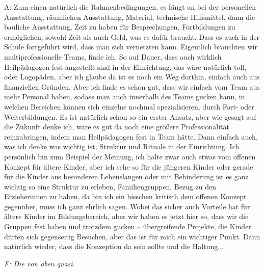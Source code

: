 A: Zum einen natürlich die Rahmenbedingungen, es fängt an bei der personellen Ausstattung, räumlichen Ausstattung, Material, technische Hilfsmittel, dann die bauliche Ausstattung, Zeit zu haben für Besprechungen, Fortbildungen zu ermöglichen, sowohl Zeit als auch Geld, was es dafür braucht. Dass es auch in der Schule fortgeführt wird, dass man sich vernetzten kann. Eigentlich bräuchten wir multiprofessionelle Teams, finde ich. So auf Dauer, dass auch wirklich Heilpädagogen fest angestellt sind in der Einrichtung, das wäre natürlich toll, oder Logopäden, aber ich glaube da ist es noch ein Weg dorthin, einfach auch aus finanziellen Gründen. Aber ich finde es schon gut, dass wir einfach vom Team aus mehr Personal haben, sodass man auch innerhalb des Teams gucken kann, in welchen Bereichen können sich einzelne nochmal spezialisieren, durch Fort- oder Weiterbildungen. Es ist natürlich schon so ein erster Ansatz, aber wie gesagt auf die Zukunft denke ich, wäre es gut da noch eine größere Professionalität reinzubringen, indem man Heilpädagogen fest in Team hätte. Dann einfach auch, was ich denke was wichtig ist, Struktur und Rituale in der Einrichtung. Ich persönlich bin zum Beispiel der Meinung, ich halte zwar auch etwas vom offenen Konzept für ältere Kinder, aber ich sehe so für die jüngeren Kinder oder gerade für die  Kinder aus besonderen Lebenslangen oder mit Behinderung ist es ganz wichtig so eine Struktur zu erleben, Familiengruppen, Bezug zu den Erzieherinnen zu haben, da bin ich ein bisschen kritisch dem offenen Konzept gegenüber, muss ich ganz ehrlich sagen. Wobei das sicher auch Vorteile hat für ältere Kinder im Bildungsbereich, aber wir haben es jetzt hier so, dass wir die Gruppen fest haben und trotzdem gucken – übergreifende Projekte, die Kinder dürfen sich gegenseitig Besuchen, aber das ist für mich ein wichtiger Punkt. Dann natürlich wieder, dass die Konzeption da sein sollte und die Haltung...

\emph{F: Die von oben quasi.}

